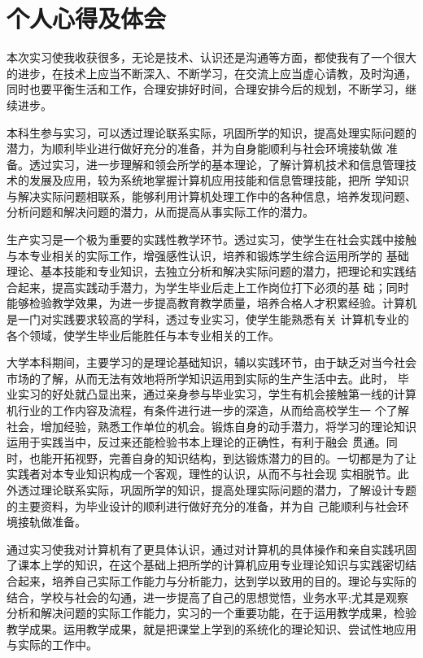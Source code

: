 \documentclass[UTF8]{ctexart}
\begin{document}
\section{个人心得及体会}
本次实习使我收获很多，无论是技术、认识还是沟通等方面，都使我有了一个很大的进步，在技术上应当不断深入、不断学习，在交流上应当虚心请教，及时沟通，同时也要平衡生活和工作，合理安排好时间，合理安排今后的规划，不断学习，继续进步。
\par
本科生参与实习，可以透过理论联系实际，巩固所学的知识，提高处理实际问题的潜力，为顺利毕业进行做好充分的准备，并为自身能顺利与社会环境接轨做
准备。透过实习，进一步理解和领会所学的基本理论，了解计算机技术和信息管理技术的发展及应用，较为系统地掌握计算机应用技能和信息管理技能，把所
学知识与解决实际问题相联系，能够利用计算机处理工作中的各种信息，培养发现问题、分析问题和解决问题的潜力，从而提高从事实际工作的潜力。
\par
生产实习是一个极为重要的实践性教学环节。透过实习，使学生在社会实践中接触与本专业相关的实际工作，增强感性认识，培养和锻炼学生综合运用所学的
基础理论、基本技能和专业知识，去独立分析和解决实际问题的潜力，把理论和实践结合起来，提高实践动手潜力，为学生毕业后走上工作岗位打下必须的基
础；同时能够检验教学效果，为进一步提高教育教学质量，培养合格人才积累经验。计算机是一门对实践要求较高的学科，透过专业实习，使学生能熟悉有关
计算机专业的各个领域，使学生毕业后能胜任与本专业相关的工作。
\par
大学本科期间，主要学习的是理论基础知识，辅以实践环节，由于缺乏对当今社会市场的了解，从而无法有效地将所学知识运用到实际的生产生活中去。此时，
毕业实习的好处就凸显出来，通过亲身参与毕业实习，学生有机会接触第一线的计算机行业的工作内容及流程，有条件进行进一步的深造，从而给高校学生一
个了解社会，增加经验，熟悉工作单位的机会。锻炼自身的动手潜力，将学习的理论知识运用于实践当中，反过来还能检验书本上理论的正确性，有利于融会
贯通。同时，也能开拓视野，完善自身的知识结构，到达锻炼潜力的目的。一切都是为了让实践者对本专业知识构成一个客观，理性的认识，从而不与社会现
实相脱节。此外透过理论联系实际，巩固所学的知识，提高处理实际问题的潜力，了解设计专题的主要资料，为毕业设计的顺利进行做好充分的准备，并为自
己能顺利与社会环境接轨做准备。
\par
通过实习使我对计算机有了更具体认识，通过对计算机的具体操作和亲自实践巩固了课本上学的知识，在这个基础上把所学的计算机应用专业理论知识与实践密切结合起来，培养自己实际工作能力与分析能力，达到学以致用的目的。理论与实际的结合，学校与社会的勾通，进一步提高了自己的思想觉悟，业务水平;尤其是观察分析和解决问题的实际工作能力，实习的一个重要功能，在于运用教学成果，检验教学成果。运用教学成果，就是把课堂上学到的系统化的理论知识、尝试性地应用与实际的工作中。
\end{document}
